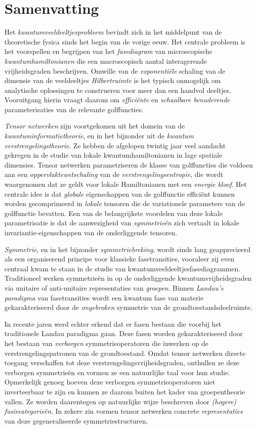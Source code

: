 \chapter*{Samenvatting}
Het \emph{kwantumveeldeeltjesprobleem} bevindt zich in het middelpunt van de theoretische fysica sinds het begin van de vorige eeuw. Het centrale probleem is het voorspellen en begrijpen van het \emph{fasediagram} van microscopische \emph{kwantumhamiltonianen} die een macroscopisch aantal interagerende vrijheidsgraden beschrijven. Omwille van de \emph{exponenti\"ele} schaling van de dimensie van de veeldeeltjes \emph{Hilbertruimte} is het typisch onmogelijk om analytische oplossingen te construeren voor meer dan een handvol deeltjes. Vooruitgang hierin vraagt daarom om \emph{effici\"ente} en \emph{schaalbare benaderende} parameterisaties van de relevante golffuncties.

\emph{Tensor netwerken} zijn voortgekomen uit het domein van de \emph{kwantuminformatietheorie}, en in het bijzonder uit de \emph{kwantum verstrengelingstheorie}. Ze hebben de afgelopen twintig jaar veel aandacht gekregen in de studie van lokale kwantumhamiltonianen in lage spatiale dimensies. Tensor netwerken parametriseren de klasse van golffuncties die voldoen aan een \emph{oppervlaktewetschaling} van de \emph{verstrengelingsentropie}, die wordt waargenomen dat ze geldt voor lokale Hamiltonianen met een \emph{energie kloof}. Het centrale idee is dat \emph{globale} eigenschappen van de golffunctie effici\"ent kunnen worden gecomprimeerd in \emph{lokale} tensoren die de variationele parameters van de golffunctie bevatten. Een van de belangrijkste voordelen van deze lokale parametrisatie is dat de aanwezigheid van \emph{symmetrie\"en} zich vertaalt in lokale invariantie-eigenschappen van de onderliggende tensoren.

\emph{Symmetrie}, en in het bijzonder \emph{symmetriebreking}, wordt sinds lang geapprecieerd als een organiserend principe voor klassieke fasetransities, vooraleer zij even centraal kwam te staan in de studie van kwantumveeldeeltjesfasediagrammen. Traditioneel werken symmetrie\"en in op de onderliggende kwantumvrijheidsgraden via unitaire of anti-unitaire representaties van \emph{groepen}. Binnen \emph{Landau's paradigma} van fasetransities wordt een kwantum fase van materie gekarakteriseerd door de \emph{ongebroken} symmetrie van de grondtoestandsdeelruimte.

In recente jaren werd echter erkend dat er fasen bestaan die voorbij het traditionele Landau paradigma gaan. Deze fasen worden gekarakteriseerd door het bestaan van \emph{verborgen} symmetrieoperatoren die inwerken op de verstrengelingspatronen van de grondtoestand. Omdat tensor netwerken directe toegang verschaffen tot deze verstrengelingsvrijheidsgraden, onthullen ze deze verborgen symmetrie\"en en vormen ze een natuurlijke taal voor hun studie. Opmerkelijk genoeg hoeven deze verborgen symmetrieoperatoren niet inverteerbaar te zijn en kunnen ze daarom buiten het kader van groepentheorie vallen. Ze worden daarentegen op natuurlijke wijze beschreven door \emph{(hogere) fusiecategorie\"en}. In zekere zin vormen tensor netwerken concrete \emph{representaties} van deze gegeneraliseerde symmetriestructuren.

